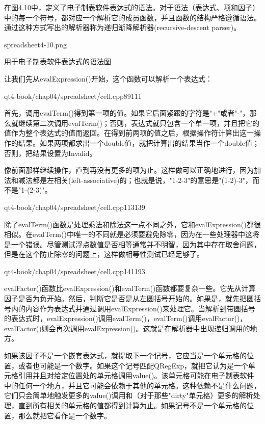 \documentclass[11pt,oneside]{book}
\begin{document}
\begin{common-format}
在图4.10中，定义了电子制表软件表达式的语法。对于语法（表达式、项和因子）中的每一个符号，都对应一个解析它的成员函数，并且函数的结构严格遵循语法。通过这种方式写出的解析器称为递归渐降解析器(recursive-descent parser)。

\begin{linefig}[0.8]{spreadsheet4-10.png}
\caption{用于电子制表软件表达式的语法图}
\label{fig:spreadsheet4-10.png}
\end{linefig}

让我们先从evalExpression()开始，这个函数可以解析一个表达式：

\begin{cppline}{qt4-book/chap04/spreadsheet/cell.cpp}{89}{111}
\end{cppline}

首先，调用evalTerm()得到第一项的值。如果它后面紧跟的字符是"+"或者"-"，那么就继续第二次调用evalTerm()；否则，表达式就只包含一个单一项，并且把它的值作为整个表达式的值而返回。在得到前两项的值之后，根据操作符计算出这一操作的结果。如果两项都求出一个double值，就把计算出的结果当作一个double值；否则，把结果设置为Invalid。

像前面那样继续操作，直到再没有更多的项为止。这样做可以正确地进行，因为加法和减法都是左相关(left-associative)的；也就是说，"1-2-3"的意思是"(1-2)-3"，而不是"1-(2-3)"。

\begin{cppline}{qt4-book/chap04/spreadsheet/cell.cpp}{113}{139}
\end{cppline}

除了evalTerm()函数是处理乘法和除法这一点不同之外，它和evalExpression()都很相似。在evalTerm()中唯一的不同就是必须要避免除零，因为在一些处理器中这将是一个错误。尽管测试浮点数值是否相等通常并不明智，因为其中存在取舍问题，但是在这个防止除零的问题上，这样做相等性测试已经足够了。

\begin{cppline}{qt4-book/chap04/spreadsheet/cell.cpp}{141}{193}
\end{cppline}

evalFactor()函数比evalExpression()和evalTerm()函数都要复杂一些。它先从计算因子是否为负开始。然后，判断它是否是从左圆括号开始的。如果是，就先把圆括号内的内容作为表达式并通过调用evalExpression()来处理它。当解析到带圆括号的表达式时，evalExpression()调用evalTerm()，evalTerm()调用evalFactor()，evalFactor()则会再次调用evalExpression()。这就是在解析器中出现递归调用的地方。

如果该因子不是一个嵌套表达式，就提取下一个记号，它应当是一个单元格的位置，或者也可能是一个数字。如果这个记号匹配QRegExp，就把它认为是一个单元格引用并且对给定位置处的单元格调用value()。该单元格可能在电子制表软件中的任何一个地方，并且它可能会依赖于其他的单元格。这种依赖不是什么问题，它们只会简单地触发更多的value()调用和（对于那些"dirty"单元格）更多的解析处理，直到所有相关的单元格的值都得到计算为止。如果记号不是一个单元格的位置，那么就把它看作是一个数字。


\end{common-format}
\end{document}
